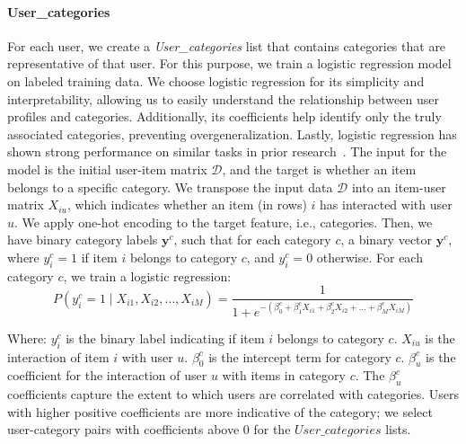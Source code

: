 \documentclass[runningheads]{llncs}
\begin{document}
\paragraph{User\_categories}
For each user, we create a \textit{User\_categories} list that contains categories that are representative of that user. 
For this purpose, we train a 
logistic regression model on labeled training data. 
We choose logistic regression for its simplicity and interpretability, allowing us to easily understand the relationship between user profiles and categories.
Additionally, its coefficients help identify only the truly associated categories, preventing overgeneralization.
Lastly, logistic regression has shown strong performance on similar tasks in prior research~\cite{weinsberg2012blurme,slokom2021PerBlur}.
The input for the model is the initial user-item matrix \( \mathcal{D} \), and the target is whether an item belongs to a specific category. 
We transpose the input data \( \mathcal{D} \) into an item-user matrix \( X_{iu} \), which indicates whether an item (in rows) \( i \) has interacted with user \( u \).
We apply one-hot encoding to the target feature, i.e., categories. %
Then, we have binary category labels \( \mathbf{y}^c \), such that for each category \( c \), a binary vector \( \mathbf{y}^c \), where \( y_i^c = 1 \) if item \( i \) belongs to category \( c \), and \( y_i^c = 0 \) otherwise.
For each category \( c \), we train a logistic regression:
\small{
\[
P(y_i^c = 1 \mid X_{i1}, X_{i2}, \ldots, X_{iM}) = \frac{1}{1 + e^{-(\beta_0^c + \beta_1^c X_{i1} + \beta_2^c X_{i2} + \ldots + \beta_M^c X_{iM})}}
\]}

Where:
\( y_i^c \) is the binary label indicating if item \( i \) belongs to category \( c \).
\( X_{iu} \) is the interaction of item \( i \) with user \( u \).
\( \beta_0^c \) is the intercept term for category \( c \).
\( \beta_u^c \) is the coefficient for the interaction of user \( u \) with items in category \( c \).
The \( \beta_u^c \) coefficients capture the extent to which users are correlated with categories. 
Users with higher positive coefficients are more indicative of the category; 
we select user-category pairs with coefficients above 0 for the $User\_categories$ lists. 
\end{document}
